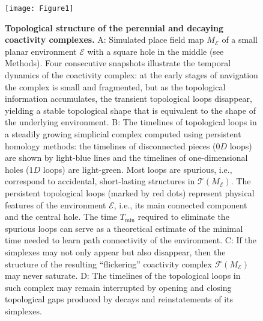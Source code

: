 \documentclass[12pt,tightenlines]{revtex4}
\begin{document}
\begin{figure}[!h]
\texttt{[image: Figure1]}
\caption{{\footnotesize\textbf{Topological structure of the perennial and decaying coactivity complexes.}
A: Simulated place field map $M_\mathcal{E}$ of a small planar environment $\mathcal{E}$ with a square hole in the middle
(see Methods). Four consecutive snapshots illustrate the temporal dynamics of the coactivity complex: at the early stages of 
navigation the complex is small and fragmented, but as the topological information accumulates, the transient topological loops 
disappear, yielding a stable topological shape that is equivalent to the shape of the underlying environment. B: The timelines 
of topological loops in a steadily growing simplicial complex computed using persistent homology methods: the timelines of 
disconnected pieces ($0D$ loops) are shown by light-blue lines and the timelines of one-dimensional holes ($1D$ loops) are 
light-green. Most loops are spurious, i.e., correspond to accidental, short-lasting structures in $\mathcal{T}(M_\mathcal{E})$. 
The persistent topological loops (marked by red dots) represent physical features of the environment $\mathcal{E}$, i.e., its 
main connected component and the central hole. The time $T_{\min}$ required to eliminate the spurious loops can serve as 
a theoretical estimate of the minimal time needed to learn path connectivity of the environment. C: If the simplexes may not 
only appear but also disappear, then the structure of the resulting ``flickering'' coactivity complex $\mathcal{F}(M_\mathcal{E})$ 
may never saturate. D: The timelines of the topological loops in such complex may remain interrupted by opening and closing 
topological gaps produced by decays and reinstatements of its simplexes.}}
\label{Figure1}
\end{figure}
\end{document}
